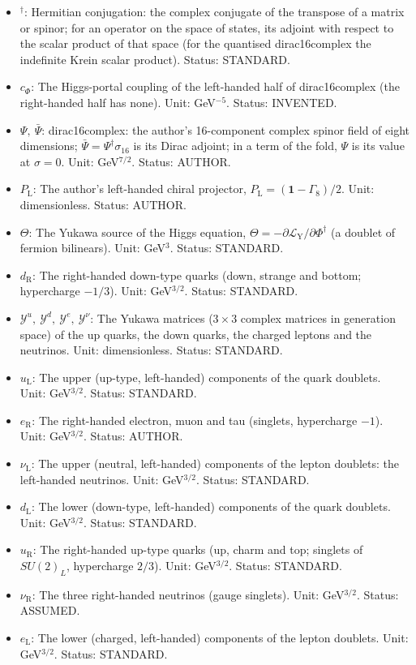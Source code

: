 \documentclass[
  10pt,
]{article}
\begin{document}
\begin{itemize}
  \(\lambda = m_h^2/(2v^2) = 0.129\). Status: AUTHOR.
\item
  \({}^\dagger\): Hermitian conjugation: the complex conjugate of the
  transpose of a matrix or spinor; for an operator on the space of
  states, its adjoint with respect to the scalar product of that space
  (for the quantised dirac16complex the indefinite Krein scalar
  product). Status: STANDARD.
\item
  \(c_\Phi\): The Higgs-portal coupling of the left-handed half of
  dirac16complex (the right-handed half has none). Unit: GeV\(^{-5}\).
  Status: INVENTED.
\item
  \(\Psi,\ \bar\Psi\): dirac16complex: the author's 16-component complex
  spinor field of eight dimensions;
  \(\bar\Psi = \Psi^\dagger\sigma_{16}\) is its Dirac adjoint; in a term
  of the fold, \(\Psi\) is its value at \(\sigma = 0\). Unit:
  GeV\(^{7/2}\). Status: AUTHOR.
\item
  \(P_{\mathrm{L}}\): The author's left-handed chiral projector,
  \(P_{\mathrm{L}} = (\mathbf{1} - \Gamma_8)/2\). Unit: dimensionless.
  Status: AUTHOR.
\item
  \(\Theta\): The Yukawa source of the Higgs equation,
  \(\Theta = -\partial\mathcal{L}_{\mathrm{Y}}/\partial\Phi^\dagger\) (a
  doublet of fermion bilinears). Unit: GeV\(^3\). Status: STANDARD.
\item
  \(d_{\mathrm{R}}\): The right-handed down-type quarks (down, strange
  and bottom; hypercharge \(-1/3\)). Unit: GeV\(^{3/2}\). Status:
  STANDARD.
\item
  \(\mathcal{Y}^{u},\ \mathcal{Y}^{d},\ \mathcal{Y}^{e},\ \mathcal{Y}^{\nu}\):
  The Yukawa matrices (\(3 \times 3\) complex matrices in generation
  space) of the up quarks, the down quarks, the charged leptons and the
  neutrinos. Unit: dimensionless. Status: STANDARD.
\item
  \(u_{\mathrm{L}}\): The upper (up-type, left-handed) components of the
  quark doublets. Unit: GeV\(^{3/2}\). Status: STANDARD.
\item
  \(e_{\mathrm{R}}\): The right-handed electron, muon and tau (singlets,
  hypercharge \(-1\)). Unit: GeV\(^{3/2}\). Status: AUTHOR.
\item
  \(\nu_{\mathrm{L}}\): The upper (neutral, left-handed) components of
  the lepton doublets: the left-handed neutrinos. Unit: GeV\(^{3/2}\).
  Status: STANDARD.
\item
  \(d_{\mathrm{L}}\): The lower (down-type, left-handed) components of
  the quark doublets. Unit: GeV\(^{3/2}\). Status: STANDARD.
\item
  \(u_{\mathrm{R}}\): The right-handed up-type quarks (up, charm and
  top; singlets of \(SU(2)_L\), hypercharge \(2/3\)). Unit:
  GeV\(^{3/2}\). Status: STANDARD.
\item
  \(\nu_{\mathrm{R}}\): The three right-handed neutrinos (gauge
  singlets). Unit: GeV\(^{3/2}\). Status: ASSUMED.
\item
  \(e_{\mathrm{L}}\): The lower (charged, left-handed) components of the
  lepton doublets. Unit: GeV\(^{3/2}\). Status: STANDARD.
\end{itemize}
\end{document}
